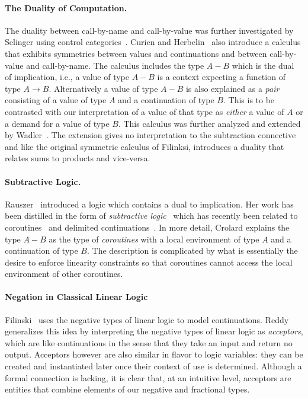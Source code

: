 \documentclass[preprint]{sigplanconf}
\begin{document}
\paragraph*{The Duality of Computation.}
The duality between call-by-name and call-by-value was further investigated
by Selinger using control
categories~\cite{Selinger:2001:CCD:966910.966911}. Curien and
Herbelin~\cite{Curien:2000} also introduce a calculus that exhibits
symmetries between values and continuations and between call-by-value and
call-by-name. The calculus includes the type $A-B$ which is the dual of
implication, i.e., a value of type $A-B$ is a context expecting a function of
type $A \rightarrow B$. Alternatively a value of type $A-B$ is also explained
as a \emph{pair} consisting of a value of type $A$ and a continuation of type
$B$. This is to be contrasted with our interpretation of a value of that type
as \emph{either} a value of $A$ or a demand for a value of type $B$. This
calculus was further analyzed and extended by
Wadler~\cite{Wadler:2003,DBLP:conf/rta/Wadler05}. The extension gives no
interpretation to the subtraction connective and like the original symmetric
calculus of Filinksi, introduces a duality that relates sums to products and
vice-versa.

\paragraph*{Subtractive Logic.} 
Rauszer~\cite{springerlink:10.1007/BF02120864,rauszer,rauszer2} introduced a
logic which contains a dual to implication. Her work has been distilled in
the form of \emph{subtractive logic}~\cite{Crolard01} which has recently been
related to coroutines~\cite{Crolard01082004} and delimited
continuations~\cite{Ariola:2009:TFD:1743339.1743381}.  In more detail,
Crolard explains the type $A-B$ as the type of \emph{coroutines} with a local
environment of type $A$ and a continuation of type $B$. The description is
complicated by what is essentially the desire to enforce linearity
constraints so that coroutines cannot access the local environment of other
coroutines. 

\paragraph*{Negation in Classical Linear Logic} 
Filinski~\cite{Filinski92} uses the negative types of linear logic to model
continuations. Reddy~\cite{Reddy91} generalizes this idea by interpreting the
negative types of linear logic as \emph{acceptors}, which are like
continuations in the sense that they take an input and return no
output. Acceptors however are also similar in flavor to logic variables:
they can be created and instantiated later once their context of use is
determined. Although a formal connection is lacking, it is clear that, at an
intuitive level, acceptors are entities that combine elements of our negative
and fractional types.
\end{document}
